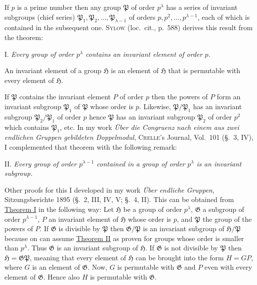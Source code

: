 \documentclass[a5paper,12pt]{article}
\let\fr\mathfrak
\newcommand{\CG}{\fr{G}}
\newcommand{\CH}{\fr{H}}
\newcommand{\CP}{\fr{P}}
\newcommand{\?}{{\color{blue}${}^{(?)}$}}
\newcounter{origpagecounter}{}
\newcommand{\origpagebreak}{\mark{\arabic{origpagecounter}}\addtocounter{origpagecounter}{1}\mark{\arabic{origpagecounter}}}
\begin{document}
If $p$ is a prime number
then any group $\CP$ of order $p^\lambda$
has
a series of invariant subgroups (chief series)
$\CP_1, \CP_2, \ldots, \CP_{\lambda-1}$
of orders
$p, p^2, \ldots, p^{\lambda-1}$,
each of which is contained in the subsequent one.
%
%
\textsc{Sylow} (loc.~cit., p.~588) derives this result
from the theorem:


I.
%
\label{t:1-1}
%
\emph{ %
Every group of order $p^\lambda$ contains
an invariant element of order $p$.
}


An invariant element of a group $\CH$
is an element of $\CH$
that
is permutable with every element of $\CH$.
%
\origpagebreak
%
If $\CP$ contains
the invariant element $P$ of order $p$
then
the powers
of $P$ form
an invariant subgroup $\CP_1$ of $\CP$
whose order is $p$.
%
%
Likewise,
$\CP / \CP_1$ has
an invariant subgroup $\CP_2 / \CP_1$ of order $p$
hence
$\CP$ has an invariant subgroup $\CP_2$ of order $p^2$
which contains $\CP_1$, etc.
%
%
In my work
\emph{\"Uber die Congruenz nach einem aus zwei endlichen Gruppen gebildeten Doppelmodul},
\textsc{Crelle}'s Journal, Vol.~101
(\S.~3, IV),
I complemented
that theorem with the following remark:


II.
%
\label{t:1-2}
%
\emph{ %
Every group of order $p^{\lambda-1}$
contained in a group of order $p^\lambda$
is an invariant subgroup.
}


Other proofs for this
I developed
in my work
\emph{\"Uber endliche Gruppen},
Sit\-zungs\-be\-richte 1895
(\S.~2, III, IV, V; \S.~4, II).
%
%
This can be obtained from
\hyperref[t:1-1]{Theorem I}
in the following way:
%
%
Let
$\CH$ be a group of order $p^\lambda$,
$\CG$ a subgroup of order $p^{\lambda-1}$,
$P$ an invariant element of $\CH$
whose order is $p$,
and
$\CP$ the group of the powers of
$P$. %
%
%
If $\CG$ is divisible by $\CP$
then
$\CG / \CP$
is an invariant subgroup of $\CH / \CP$
because
on can assume
\hyperref[t:1-2]{Theorem II}
as proven
for groups whose order is smaller than $p^\lambda$.
%
%
Thus $\CG$ is an invariant subgroup of $\CH$.
%
%
If $\CG$ is not divisible by $\CP$
then $\CH = \CG \CP$,
meaning that
every element of $\CH$
can be brought into the form $H = G P$,
where $G$ is an element of $\CG$.
%
%
Now,
$G$ is permutable with $\CG$
and
$P$ even with every element of $\CG$.
%
%
Hence
also $H$ is permutable with $\CG$.
\end{document}
